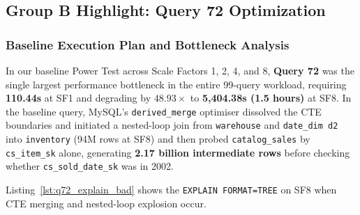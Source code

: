 \documentclass{ULBreport}
\begin{document}
\subsection{Group B Highlight: Query 72 Optimization}

\subsubsection{Baseline Execution Plan and Bottleneck Analysis}
In our baseline Power Test across Scale Factors 1, 2, 4, and 8, \textbf{Query 72} was the single largest performance bottleneck in the entire 99-query workload, requiring \textbf{110.44s} at SF1 and degrading by $48.93\times$ to \textbf{5,404.38s (1.5 hours)} at SF8. In the baseline query, MySQL's \texttt{derived\_merge} optimiser dissolved the CTE boundaries and initiated a nested-loop join from \texttt{warehouse} and \texttt{date\_dim d2} into \texttt{inventory} (94M rows at SF8) and then probed \texttt{catalog\_sales} by \texttt{cs\_item\_sk} alone, generating \textbf{2.17 billion intermediate rows} before checking whether \texttt{cs\_sold\_date\_sk} was in 2002.

Listing~\ref{lst:q72_explain_bad} shows the \texttt{EXPLAIN FORMAT=TREE} on SF8 when CTE merging and nested-loop explosion occur.
\end{document}
